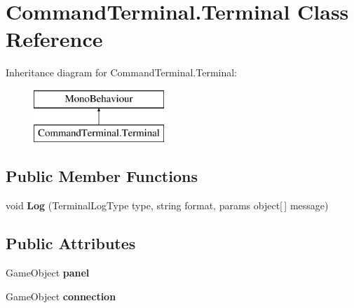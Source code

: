 \hypertarget{class_command_terminal_1_1_terminal}{}\section{Command\+Terminal.\+Terminal Class Reference}
\label{class_command_terminal_1_1_terminal}
Inheritance diagram for Command\+Terminal.\+Terminal\+:\begin{figure}[H]
\begin{center}
\leavevmode
\includegraphics[height=2.000000cm]{class_command_terminal_1_1_terminal}
\end{center}
\end{figure}
\subsection*{Public Member Functions}
\begin{DoxyCompactItemize}
\item 
\mbox{\label{class_command_terminal_1_1_terminal_aed10e8ce3d7b7c8f5844de0246b59fbc}} 
void {\bfseries Log} (Terminal\+Log\+Type type, string format, params object\mbox{[}$\,$\mbox{]} message)
\end{DoxyCompactItemize}
\subsection*{Public Attributes}
\begin{DoxyCompactItemize}
\item 
\mbox{\label{class_command_terminal_1_1_terminal_a685acbda06ea2b49b4382ba2a10898af}} 
Game\+Object {\bfseries panel}
\item 
\mbox{\label{class_command_terminal_1_1_terminal_a3fa56c897c2474bdd94604bb3a486766}} 
Game\+Object {\bfseries connection}
\end{DoxyCompactItemize}
